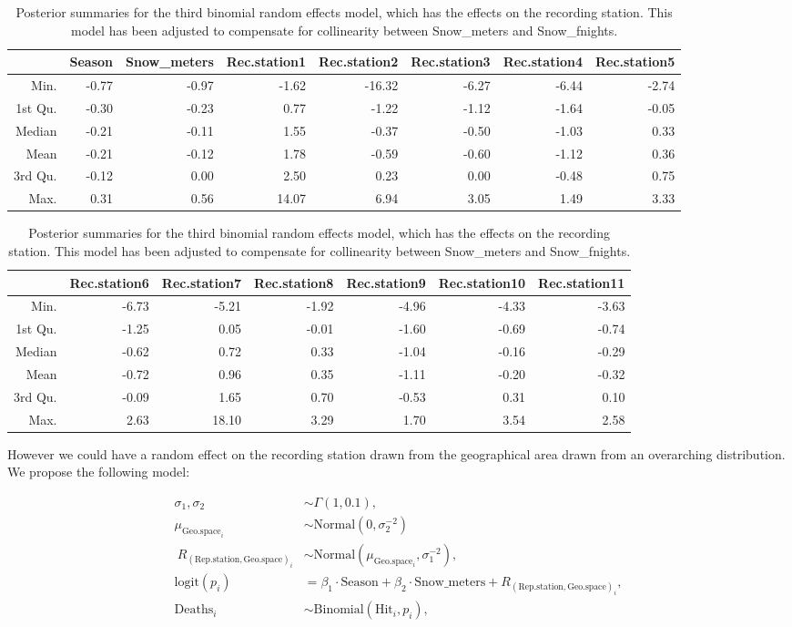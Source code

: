 \documentclass[10pt]{extarticle}
\begin{document}
\begin{table}[H]
	\centering
	\begin{tabular}{r|rrrrrrr}
		\hline
		& Season & Snow\_meters & Rec.station1 & Rec.station2 & Rec.station3 & Rec.station4 & Rec.station5 \\ 
		\hline
		Min. & -0.77 & -0.97 & -1.62 & -16.32 & -6.27 & -6.44 & -2.74 \\ 
		1st Qu. & -0.30 & -0.23 & 0.77 & -1.22 & -1.12 & -1.64 & -0.05 \\ 
		Median & -0.21 & -0.11 & 1.55 & -0.37 & -0.50 & -1.03 & 0.33 \\ 
		Mean & -0.21 & -0.12 & 1.78 & -0.59 & -0.60 & -1.12 & 0.36 \\ 
		3rd Qu. & -0.12 & 0.00 & 2.50 & 0.23 & 0.00 & -0.48 & 0.75 \\ 
		Max. & 0.31 & 0.56 & 14.07 & 6.94 & 3.05 & 1.49 & 3.33 \\ 
		\hline
	\end{tabular}

\vspace{1em}

	\begin{tabular}{r|rrrrrr}
		\hline
		& Rec.station6 & Rec.station7 & Rec.station8 & Rec.station9 & Rec.station10 & Rec.station11 \\ 
		\hline
		Min. & -6.73 & -5.21 & -1.92 & -4.96 & -4.33 & -3.63 \\ 
		1st Qu. & -1.25 & 0.05 & -0.01 & -1.60 & -0.69 & -0.74 \\ 
		Median & -0.62 & 0.72 & 0.33 & -1.04 & -0.16 & -0.29 \\ 
		Mean & -0.72 & 0.96 & 0.35 & -1.11 & -0.20 & -0.32 \\ 
		3rd Qu. & -0.09 & 1.65 & 0.70 & -0.53 & 0.31 & 0.10 \\ 
		Max. & 2.63 & 18.10 & 3.29 & 1.70 & 3.54 & 2.58 \\ 
		\hline
	\end{tabular}
\caption{Posterior summaries for the third binomial random effects model, which has the effects on the recording station. This model has been adjusted to compensate for collinearity between Snow\_meters and Snow\_fnights.}
\label{tab:postsum_binmod3}
\end{table}

However we could have a random effect on the recording station drawn from the geographical area drawn from an overarching distribution. We propose the following model:

\begin{align*}
\sigma_1, \sigma_2 &\sim \Gamma(1, 0.1), \\
\mu_{\mathrm{Geo.space}_i} &\sim \mathrm{Normal}(0, \sigma_2^{-2})\\\
R_{\mathrm{(Rep.station, Geo.space)}_i} &\sim \mathrm{Normal}(\mu_{\mathrm{Geo.space}_i}, \sigma_1^{-2}),\\
\mathrm{logit}(p_i) &= \beta_1 \cdot \mathrm{Season} + \beta_2 \cdot \mathrm{Snow\_meters} + R_{\mathrm{(Rep.station, Geo.space)}_i}, \\
\mathrm{Deaths}_i &\sim \mathrm{Binomial}(\mathrm{Hit}_i, p_i),
\end{align*}
\end{document}
